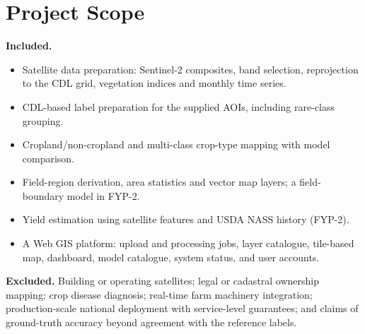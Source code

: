 \section{Project Scope}
\textbf{Included.}
\begin{itemize}
  \item Satellite data preparation: Sentinel-2 composites, band selection, reprojection to the
        CDL grid, vegetation indices and monthly time series.
  \item CDL-based label preparation for the supplied AOIs, including rare-class grouping.
  \item Cropland/non-cropland and multi-class crop-type mapping with model comparison.
  \item Field-region derivation, area statistics and vector map layers; a field-boundary model in
        FYP-2.
  \item Yield estimation using satellite features and USDA NASS history (FYP-2).
  \item A Web GIS platform: upload and processing jobs, layer catalogue, tile-based map, dashboard,
        model catalogue, system status, and user accounts.
\end{itemize}
\textbf{Excluded.} Building or operating satellites; legal or cadastral ownership mapping; crop
disease diagnosis; real-time farm machinery integration; production-scale national deployment
with service-level guarantees; and claims of ground-truth accuracy beyond agreement with the
reference labels.

